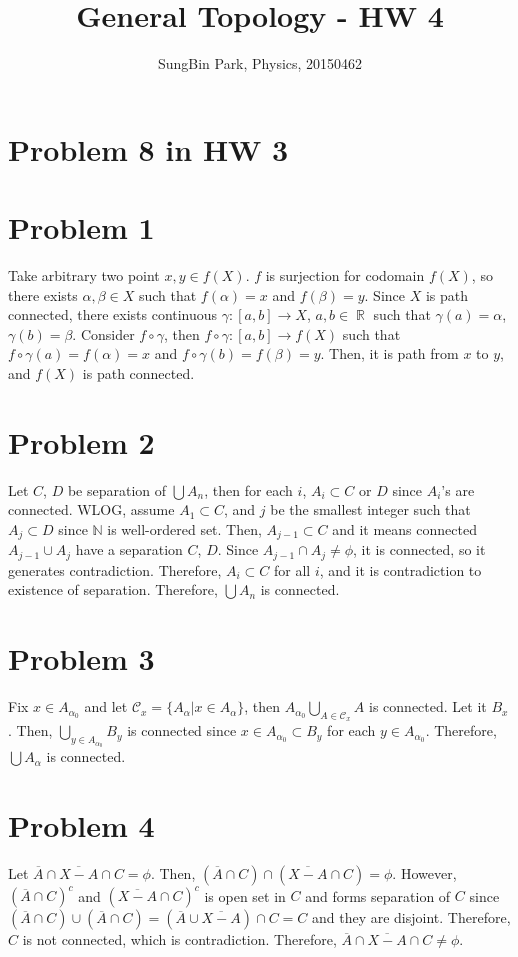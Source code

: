 \documentclass{article}
\DeclareMathOperator{\rr}{\mathbb{R}}
\begin{document}
\title{General Topology - HW 4}
\author{SungBin Park, Physics, 20150462} 

 \maketitle
\section*{Problem 8 in HW 3}
\section*{Problem 1}
Take arbitrary two point $x,y\in f(X)$. $f$ is surjection for codomain $f(X)$, so there exists $\alpha, \beta\in X$ such that $f(\alpha)=x$ and $f(\beta)=y$. Since $X$ is path connected, there exists continuous $\gamma:[a,b]\rightarrow X$, $a,b\in \rr$ such that $\gamma(a)=\alpha$, $\gamma(b)=\beta$. Consider $f\circ \gamma$, then $f\circ \gamma:[a,b]\rightarrow f(X)$ such that $f\circ \gamma(a)=f(\alpha)=x$ and $f\circ\gamma(b)=f(\beta)=y$. Then, it is path from $x$ to $y$, and $f(X)$ is path connected.
\section*{Problem 2}
Let $C$, $D$ be separation of $\bigcup A_n$, then for each $i$, $A_i\subset C$ or $D$ since $A_i$'s are connected. WLOG, assume $A_1\subset C$, and $j$ be the smallest integer such that $A_j \subset D$ since $\mathbb{N}$ is well-ordered set. Then, $A_{j-1}\subset C$ and it means connected $A_{j-1}\cup A_{j}$ have a separation $C$, $D$. Since $A_{j-1}\cap A_{j}\neq \phi$, it is connected, so it generates contradiction. Therefore, $A_i\subset C$ for all $i$, and it is contradiction to existence of separation. Therefore, $\bigcup A_n$ is connected.
\section*{Problem 3}
Fix $x\in A_{\alpha_0}$ and let $\mathcal{C}_x=\{A_{\alpha}|x\in A_{\alpha}\}$, then $A_{\alpha_0}\bigcup_{A\in \mathcal{C}_x} A$ is connected. Let it $B_x$. Then, $\bigcup_{y\in A_{\alpha_0}} B_y$ is connected since $x\in A_{\alpha_0}\subset B_y$ for each $y\in A_{\alpha_0}$. Therefore, $\bigcup A_\alpha$ is connected.
\section*{Problem 4}
Let $\overline{A}\cap \overline{X-A}\cap C=\phi$. Then, $\left(\overline{A}\cap C\right)\cap\left(\overline{X-A}\cap C\right)=\phi$. However, $\left(\overline{A}\cap C\right)^c$ and $\left(\overline{X-A}\cap C\right)^c$ is open set in $C$ and forms separation of $C$ since $\left(\overline{A}\cap C\right)\cup \left(\overline{A}\cap C\right) = \left(\overline{A}\cup \overline{X-A}\right) \cap C=C$ and they are disjoint. Therefore, $C$ is not connected, which is contradiction. Therefore, $\overline{A}\cap \overline{X-A}\cap C\neq\phi$.
\end{document}
